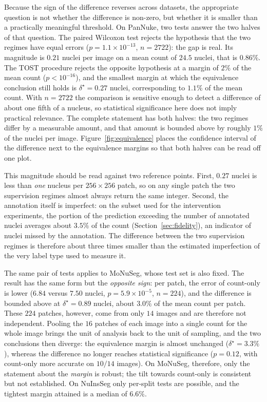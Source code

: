 \documentclass[preprint,12pt]{elsarticle}
\begin{document}
Because the sign of the difference reverses across datasets, the appropriate question is not whether the
difference is non-zero, but whether it is smaller than a practically meaningful threshold. On PanNuke, two
tests answer the two halves of that question. The paired Wilcoxon test rejects the hypothesis that the two
regimes have equal errors ($p = 1.1 \times 10^{-13}$, $n = 2722$): the gap is real. Its magnitude is $0.21$
nuclei per image on a mean count of $24.5$ nuclei, that is $0.86\%$. The TOST procedure rejects the opposite
hypothesis at a margin of $2\%$ of the mean count ($p < 10^{-16}$), and the smallest margin at which the
equivalence conclusion still holds is $\delta^\star = 0.27$ nuclei, corresponding to $1.1\%$ of the mean count.
With $n = 2722$ the comparison is sensitive enough to detect a difference of about one fifth of a nucleus, so
statistical significance here does not imply practical relevance. The complete statement has both halves: the
two regimes differ by a measurable amount, and that amount is bounded above by roughly $1\%$ of the nuclei per
image. Figure~\ref{fig:equivalence} places the confidence interval of the difference next to the equivalence
margins so that both halves can be read off one plot.

This magnitude should be read against two reference points. First, $0.27$ nuclei is less than \emph{one}
nucleus per $256\times256$ patch, so on any single patch the two supervision regimes almost always return the
same integer. Second, the annotation itself is imperfect: on the subset used for the intervention experiments,
the portion of the prediction exceeding the number of annotated nuclei averages about $3.5\%$ of the count
(Section~\ref{sec:fidelity}), an indicator of nuclei missed by the annotation. The difference between the two
supervision regimes is therefore about three times smaller than the estimated imperfection of the very label
type used to measure it.

The same pair of tests applies to MoNuSeg, whose test set is also fixed. The result has the same form but the
\emph{opposite sign}: per patch, the error of count-only is lower ($6.84$ versus $7.50$ nuclei,
$p = 5.9 \times 10^{-5}$, $n = 224$), and the difference is bounded above at $\delta^\star = 0.89$ nuclei,
about $3.0\%$ of the mean count per patch. These $224$ patches, however, come from only $14$ images and are
therefore not independent. Pooling the $16$ patches of each image into a single count for the whole image
brings the unit of analysis back to the unit of sampling, and the two conclusions then diverge: the equivalence
margin is almost unchanged ($\delta^\star = 3.3\%$), whereas the difference no longer reaches statistical
significance ($p = 0.12$, with count-only more accurate on $10/14$ images). On MoNuSeg, therefore, only the
statement about the \emph{margin} is robust; the tilt towards count-only is consistent but not established.
On NuInsSeg only per-split tests are possible, and the tightest margin attained is a median of $6.6\%$.
\end{document}
